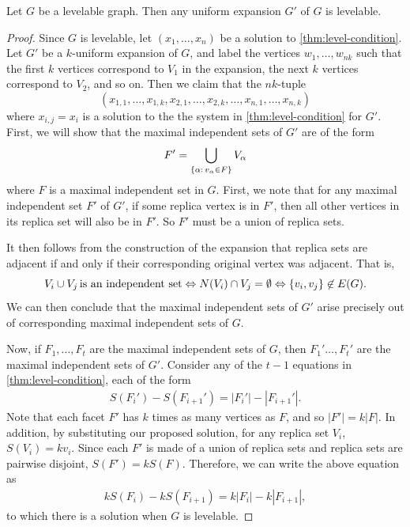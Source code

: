 \begin{theorem} \label{thm:expansion}
Let $G$ be a levelable graph. Then any uniform expansion $G'$ of $G$ is levelable.
\end{theorem}
\begin{proof}
Since $G$ is levelable, let $(x_1, \dots, x_n)$ be a solution to \autoref{thm:level-condition}. Let $G'$ be a $k$-uniform expansion of $G$, and label the vertices $w_1, \dots, w_{nk}$ such that the first $k$ vertices correspond to $V_1$ in the expansion, the next $k$ vertices correspond to $V_2$, and so on. Then we claim that the $nk$-tuple $$(x_{1,1}, \dots, x_{1, k}, x_{2, 1}, \dots, x_{2, k}, \dots,x_{n, 1}, \dots, x_{n, k})$$ where $x_{i, j} = x_i$ is a solution to the the system in \autoref{thm:level-condition} for $G'$. 
First, we will show that the maximal independent sets of $G'$ are of the form 
\begin{equation*} \label{eq:expansion-union}
F' = \bigcup_{\{ \alpha: \, v_\alpha \in F \}}  V_\alpha 
\end{equation*}
where $F$ is a maximal independent set in $G$. First, we note that for any maximal independent set $F'$ of $G'$, if some replica vertex is in $F'$, then all other vertices in its replica set will also be in $F'$. So $F'$ must be a union of replica sets.

It then follows from the construction of the expansion that replica sets are adjacent if and only if their corresponding original vertex was adjacent. That is,
$$
V_i \cup V_j \, \textrm{is an independent set} \Leftrightarrow N(V_i) \cap V_j = \emptyset \Leftrightarrow \{ v_i, v_j \} \not \in E(G).
$$
We can then conclude that the maximal independent sets of $G'$ arise precisely out of corresponding maximal independent sets of $G$. 

Now, if $F_1, \dots, F_t$ are the maximal independent sets of $G$, then $F_1' \dots, F_t'$ are the maximal independent sets of $G'$. Consider any of the $t-1$ equations in \autoref{thm:level-condition}, each of the form
\begin{equation*}
\begin{aligned}
S(F_i') - S(F_{i+1}') = |F_i'| - |F_{i+1}'|.
\end{aligned}
\end{equation*}
Note that each facet $F'$ has $k$ times as many vertices as $F$, and so $|F'| = k |F|$. In addition, by substituting our proposed solution, for any replica set $V_i$, $S(V_i) = k v_i$. Since each $F'$ is made of a union of replica sets and replica sets are pairwise disjoint, $S(F') = k S(F)$. Therefore, we can write the above equation as
\begin{equation*}
\begin{aligned}
kS(F_i) - kS(F_{i+1}) = k|F_i| - k|F_{i+1}|,
\end{aligned}
\end{equation*}
to which there is a solution when $G$ is levelable.
\end{proof}

